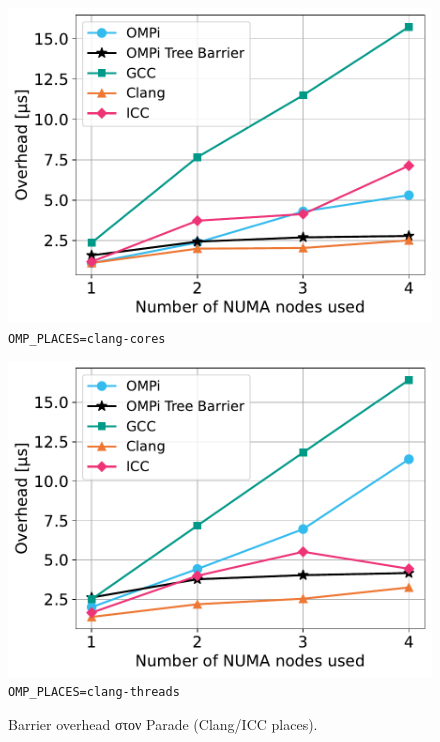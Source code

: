 \begin{figure}
    \centering
    \begin{minipage}{0.5\textwidth}
        \centering
        \includegraphics[width=1\textwidth]{Figures/epcc_20210823_175412/clang-places_cores_close.pdf}
		\texttt{OMP\_PLACES=clang-cores}
    \end{minipage}\hfill
    \begin{minipage}{0.5\textwidth}
        \centering
        \includegraphics[width=1\textwidth]{Figures/epcc_20210823_175412/clang-places_threads_close.pdf}
        \texttt{OMP\_PLACES=clang-threads}
    \end{minipage}
    \caption{Barrier overhead στον Parade (Clang/ICC places).}
    \label{fig:bo-parade-clang-places}
\end{figure}



